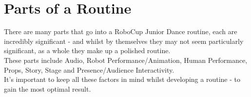 	\section{Parts of a Routine}
    	There are many parts that go into a RoboCup Junior Dance routine, each are incredibly significant - and whilst by themselves they may not seem particularly significant, as a whole they make up a polished routine.\\
        
        These parts include Audio, Robot Performance/Animation, Human Performance, Props, Story, Stage and Presence/Audience Interactivity.\\
        
        It's important to keep all these factors in mind whilst developing a routine - to gain the most optimal result.\\
        
        
        
        